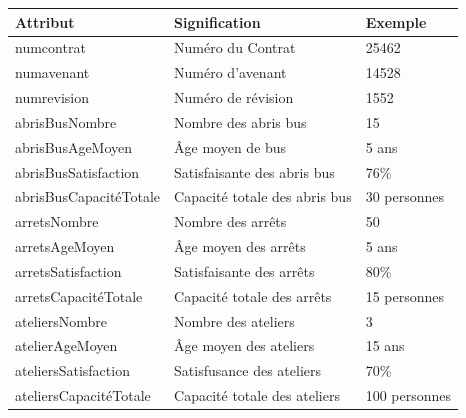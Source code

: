 \documentclass[a4paper]{report}
\begin{document}
\begin{doublespace}
	\begin{table}[H]
		\begin{center}
			\begin{tabularx}{17.5cm}{|X|X|p{2.5cm}|}
				\hline
				\textbf{Attribut}                  & \textbf{Signification}                     & \textbf{Exemple} \\
				\hline
				numcontrat                         & Numéro du Contrat                          & 25462            \\
				\hline
				numavenant                         & Numéro d'avenant                           & 14528            \\
				\hline
				numrevision                        & Numéro de révision                         & 1552             \\
				\hline
				abrisBusNombre                     & Nombre des abris bus                       & 15               \\
				\hline
				abrisBusAgeMoyen                   & Âge moyen de bus                           & 5 ans            \\
				\hline
				abrisBusSatisfaction               & Satisfaisante des abris bus                & 76\%             \\
				\hline
				abrisBusCapacitéTotale             & Capacité totale des abris bus              & 30 personnes     \\
				\hline
				arretsNombre                       & Nombre des arrêts                          & 50               \\
				\hline
				arretsAgeMoyen                     & Âge moyen des arrêts                       & 5 ans            \\
				\hline
				arretsSatisfaction                 & Satisfaisante des arrêts                   & 80\%             \\
				\hline
				arretsCapacitéTotale               & Capacité totale des arrêts                 & 15 personnes     \\
				\hline
				ateliersNombre                     & Nombre des ateliers                        & 3                \\
				\hline
				atelierAgeMoyen                    & Âge moyen des ateliers                     & 15 ans           \\
				\hline
				ateliersSatisfaction               & Satisfusance des ateliers                  & 70\%             \\
				\hline
				ateliersCapacitéTotale             & Capacité totale des ateliers               & 100 personnes    \\

\end{tabularx}
\end{center}
\end{table}
\end{doublespace}
\end{document}
